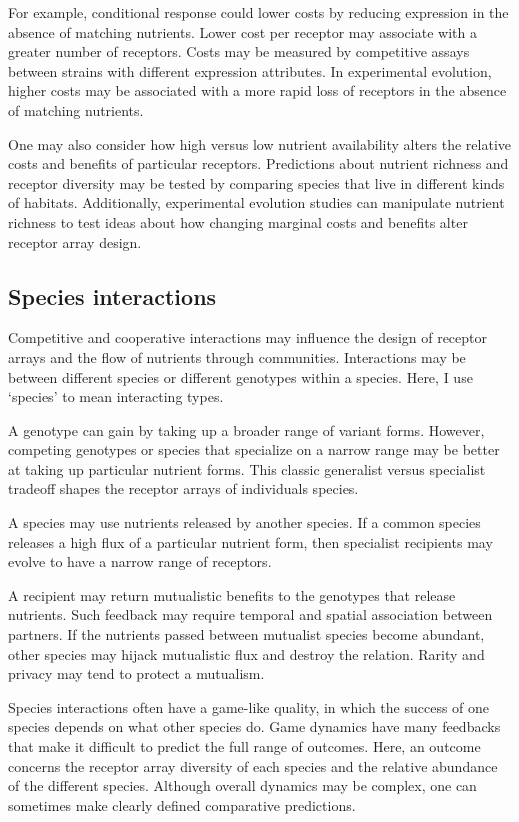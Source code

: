 \documentclass[\mydocfontsize]{article}
\begin{document}
\begin{multicols}{2}
For example, conditional response could lower costs by reducing expression in the absence of matching nutrients. Lower cost per receptor may associate with a greater number of receptors. Costs may be measured by competitive assays between strains with different expression attributes. In experimental evolution, higher costs may be associated with a more rapid loss of receptors in the absence of matching nutrients. 

One may also consider how high versus low nutrient availability alters the relative costs and benefits of particular receptors. Predictions about nutrient richness and receptor diversity may be tested by comparing species that live in different kinds of habitats. Additionally, experimental evolution studies can manipulate nutrient richness to test ideas about how changing marginal costs and benefits alter receptor array design.

\subsection{Species interactions}

Competitive and cooperative interactions may influence the design of receptor arrays and the flow of nutrients through communities. Interactions may be between different species or different genotypes within a species. Here, I use `species' to mean interacting types. 

 A genotype can gain by taking up a broader range of variant forms. However, competing genotypes or species that specialize on a narrow range may be better at taking up particular nutrient forms. This classic generalist versus specialist tradeoff shapes the receptor arrays of individuals species.  

 A species may use nutrients released by another species. If a common species releases a high flux of a particular nutrient form, then specialist recipients may evolve to have a narrow range of receptors.  

 A recipient may return mutualistic benefits to the genotypes that release nutrients. Such feedback may require temporal and spatial association between partners. If the nutrients passed between mutualist species become abundant, other species may hijack mutualistic flux and destroy the relation. Rarity and privacy may tend to protect a mutualism. 

 Species interactions often have a game-like quality, in which the success of one species depends on what other species do. Game dynamics have many feedbacks that make it difficult to predict the full range of outcomes. Here, an outcome concerns the receptor array diversity of each species and the relative abundance of the different species. Although overall dynamics may be complex, one can sometimes make clearly defined comparative predictions.


\end{multicols}
\end{document}
